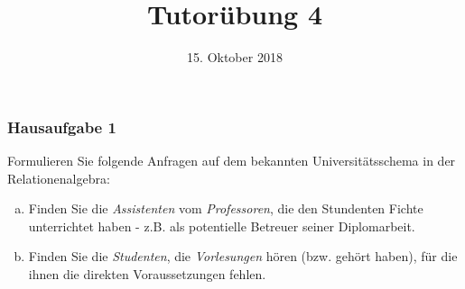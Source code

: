 %
% 
% 
%







\newcommand{\Datum}{\today}

\renewcommand{\PraesentationFusszeileZusatz}{| Tutorium Grundlagen: Datenbanken WS 18/19}

\title{Tutorübung 4}
\author{\PersonVorname{} \PersonNachname}
\institute[]{\UniversitaetName \\ \FakultaetName}
\date[\Datum]{15. Oktober 2018}



\setlength{\baselineskip}{\PraesentationAbstandAbsatz}
\setlength{\parskip}{\baselineskip}

\PraesentationMasterStandard

\PraesentationTitelseite %

\begin{frame}
	\frametitle{Hausaufgabe 1}
	\vspace{0.5cm}

	Formulieren Sie folgende Anfragen auf dem bekannten Universitätsschema in der Relationenalgebra:
	\begin{enumerate}[a)]
		\item Finden Sie die \textit{Assistenten} vom \textit{Professoren}, die den Stundenten Fichte unterrichtet haben -
		      z.B. als potentielle Betreuer seiner Diplomarbeit.
		\item Finden Sie die \textit{Studenten}, die \textit{Vorlesungen} hören (bzw. gehört haben), für die ihnen
		      die direkten Voraussetzungen fehlen.
	\end{enumerate}
\end{frame}

